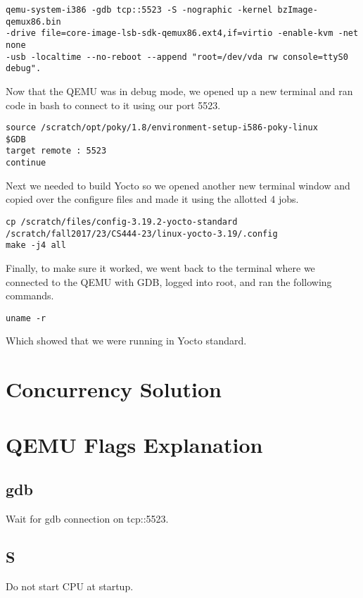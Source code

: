 \documentclass[10pt,letterpaper,onecolumn,draftclsnofoot]{IEEEtran}
\begin{document}
\begin{lstlisting}
qemu-system-i386 -gdb tcp::5523 -S -nographic -kernel bzImage-qemux86.bin 
-drive file=core-image-lsb-sdk-qemux86.ext4,if=virtio -enable-kvm -net none 
-usb -localtime --no-reboot --append "root=/dev/vda rw console=ttyS0 debug".
\end{lstlisting}

Now that the QEMU was in debug mode, we opened up a new terminal and ran code
in bash to connect to it using our port 5523.

\begin{lstlisting}
source /scratch/opt/poky/1.8/environment-setup-i586-poky-linux
$GDB
target remote : 5523
continue
\end{lstlisting}

Next we needed to build Yocto so we opened another new terminal window and
copied over the configure files and made it using the allotted 4 jobs.

\begin{lstlisting}
cp /scratch/files/config-3.19.2-yocto-standard 
/scratch/fall2017/23/CS444-23/linux-yocto-3.19/.config
make -j4 all
\end{lstlisting}

Finally, to make sure it worked, we went back to the terminal where we
connected to the QEMU with GDB, logged into root, and ran the following commands.

\begin{lstlisting}
uname -r
\end{lstlisting}

Which showed that we were running in Yocto standard.

\section{Concurrency Solution}

\section{QEMU Flags Explanation}
\subsection{gdb}
Wait for gdb connection on tcp::5523.

\subsection{S}
Do not start CPU at startup.
\end{document}
